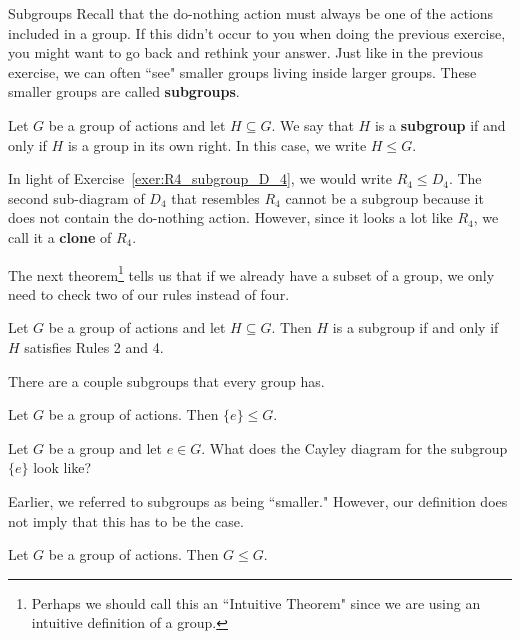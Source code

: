 \begin{section}{Subgroups}
Recall that the do-nothing action must always be one of the actions included in a group.  If this didn't occur to you when doing the previous exercise, you might want to go back and rethink your answer.  Just like in the previous exercise, we can often ``see" smaller groups living inside larger groups.  These smaller groups are called \textbf{subgroups}.

\begin{intuitivedef}
Let \(G\) be a group of actions and let \(H\subseteq G\).  We say that \(H\) is a \textbf{subgroup} if and only if \(H\) is a group in its own right.  In this case, we write \(H\leq G\).
\end{intuitivedef}

In light of Exercise~\ref{exer:R4_subgroup_D_4}, we would write \(R_4\leq D_4\).  The second sub-diagram of \(D_4\) that resembles \(R_4\) cannot be a subgroup because it does not contain the do-nothing action.  However, since it looks a lot like \(R_4\), we call it a \textbf{clone} of \(R_4\).

The next theorem\footnote{Perhaps we should call this an ``Intuitive Theorem" since we are using an intuitive definition of a group.} tells us that if we already have a subset of a group, we only need to check two of our rules instead of four.

\begin{theorem}\label{thm:informal_subgroup_criterion}
Let \(G\) be a group of actions and let \(H\subseteq G\). Then \(H\) is a subgroup if and only if \(H\) satisfies Rules 2 and 4.%
\end{theorem}

There are a couple subgroups that every group has.

\begin{theorem}\label{thm:trivial_subgroup1}
Let \(G\) be a group of actions.  Then \(\{e\}\leq G\).
\end{theorem}

\begin{exercise}
Let \(G\) be a group and let \(e\in G\).  What does the Cayley diagram for the subgroup \(\{e\}\) look like?
\end{exercise}

Earlier, we referred to subgroups as being ``smaller."  However, our definition does not imply that this has to be the case.

\begin{theorem}\label{thm:trivial_subgroup2}
Let \(G\) be a group of actions.  Then \(G\leq G\).
\end{theorem}


\end{section}
